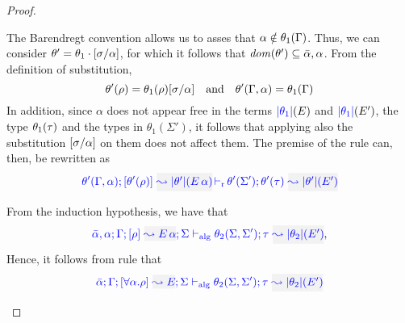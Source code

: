 \begin{proof}
\begin{description}
The Barendregt convention allows us to asses that $\alpha\notin\theta_1(\Gamma)$. Thus, we can
consider $\theta'=\theta_1\cdot[\sigma/\alpha]$, for which it follows that
${\it dom }{(\theta')}\subseteq\bar\alpha,\alpha$. From the definition of substitution,
\begin{equation*}
  \theta'(\rho) = \theta_1(\rho)[\sigma/\alpha]\quad\text{and}\quad
  \theta'(\Gamma,\alpha) = \theta_1(\Gamma)
\end{equation*}
In addition, since $\alpha$ does not appear free in the terms ${\color{blue} |\theta_1|}(E)$ and
${\color{blue} |\theta_1|}(E')$, the type $\theta_1(\tau)$ and the types in $\theta_1(\Sigma')$,
it follows that applying also the substitution $[\sigma/\alpha]$ on them does not affect them.
The premise of the rule can, then, be rewritten as
\begin{equation*}
  \dmres{\theta'(\tenv,\alpha)}{\theta'(\rulet)}{\etrans{\theta'}(\mmapp{E}{\alpha})}{\theta'(\type)}{\etrans{\theta'}(E')}{\theta'(\Sigma')}
\end{equation*}
  
From the induction hypothesis, we have that
\begin{equation*}
  \admres{\bar\alpha,\alpha}{\tenv}{\rulet}{\mmapp{E}{\alpha}}{\Sigma}{\type}{\etrans{\theta_2}(E')}{\theta_2(\Sigma,\Sigma')}
,\end{equation*}
Hence, it follows from rule  that
\begin{equation*}
\admres{\bar\alpha}{\tenv}{\tall{\alpha}{\rulet}}{E}{\Sigma}{\type}{\etrans{\theta_2}(E')}{\theta_2(\Sigma,\Sigma')}
\end{equation*}


\end{description}
\end{proof}

